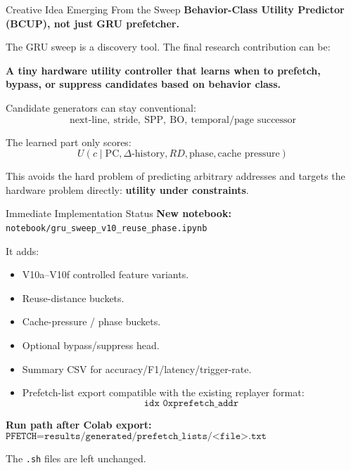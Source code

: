 \documentclass[10pt,aspectratio=169]{beamer}
\begin{document}
\begin{frame}{Creative Idea Emerging From the Sweep}
  \textbf{Behavior-Class Utility Predictor (BCUP), not just GRU prefetcher.}

  \vspace{0.3em}
  The GRU sweep is a discovery tool. The final research contribution can be:

  \vspace{0.3em}
  \begin{center}
  \Large
  \textbf{A tiny hardware utility controller that learns when to prefetch, bypass, or suppress candidates based on behavior class.}
  \end{center}

  \vspace{0.4em}
  Candidate generators can stay conventional:
  \[
    \text{next-line},\ \text{stride},\ \text{SPP},\ \text{BO},\ \text{temporal/page successor}
  \]

  \vspace{0.3em}
  The learned part only scores:
  \[
    U(c \mid \text{PC}, \Delta\text{-history}, RD, \text{phase}, \text{cache pressure})
  \]

  \vspace{0.3em}
  This avoids the hard problem of predicting arbitrary addresses and targets the hardware problem directly: \textbf{utility under constraints}.
\end{frame}

\begin{frame}{Immediate Implementation Status}
  \textbf{New notebook:} \texttt{notebook/gru\_sweep\_v10\_reuse\_phase.ipynb}

  \vspace{0.3em}
  It adds:
  \begin{itemize}
    \item V10a--V10f controlled feature variants.
    \item Reuse-distance buckets.
    \item Cache-pressure / phase buckets.
    \item Optional bypass/suppress head.
    \item Summary CSV for accuracy/F1/latency/trigger-rate.
    \item Prefetch-list export compatible with the existing replayer format:
      \[
        \texttt{idx\ \ 0xprefetch\_addr}
      \]
  \end{itemize}

  \vspace{0.3em}
  \textbf{Run path after Colab export:}
  \[
    \texttt{PFETCH=results/generated/prefetch\_lists/<file>.txt\ MODEL\_TAG=GRU\_V10... bash scripts/run\_nn\_replay.sh}
  \]

  \vspace{0.3em}
  The \texttt{.sh} files are left unchanged.
\end{frame}
\end{document}
